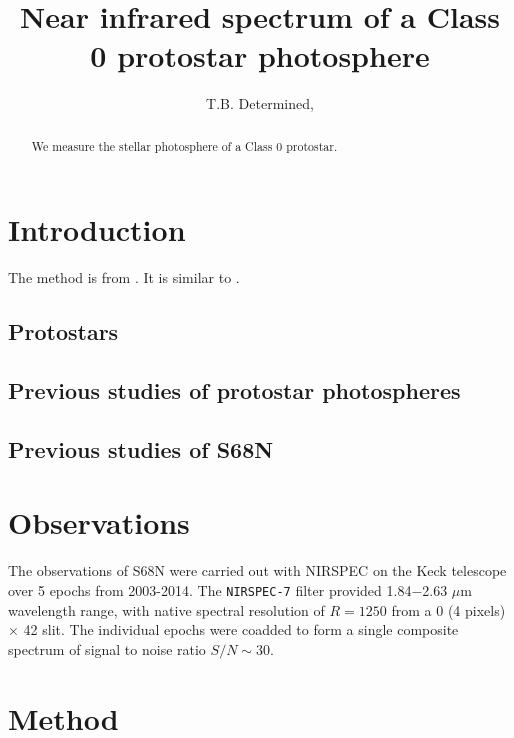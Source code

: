 \documentclass[twocolumn]{emulateapj}%
\begin{document}
 
\title{Near infrared spectrum of a Class 0 protostar photosphere}

\author{T.B. Determined,}



\begin{abstract}
We measure the stellar photosphere of a Class 0 protostar.
\end{abstract}


\maketitle

\section{Introduction}\label{sec:intro}
The method is from \citep{czekala15}.  It is similar to \citep{2017ApJ...836..200G}.

\subsection{Protostars}
\subsection{Previous studies of protostar photospheres}
\subsection{Previous studies of S68N}


\section{Observations}
The observations of S68N were carried out with NIRSPEC on the Keck telescope over 5 epochs from 2003-2014.  The \texttt{NIRSPEC-7} filter provided 1.84$-$2.63 $\mu$m wavelength range, with native spectral resolution of $R=1250$ from a 0 (4 pixels) $\times$ 42 slit.  
The individual epochs were coadded to form a single composite spectrum of signal to noise ratio $S/N\sim30$.  

\section{Method}
\end{document}
